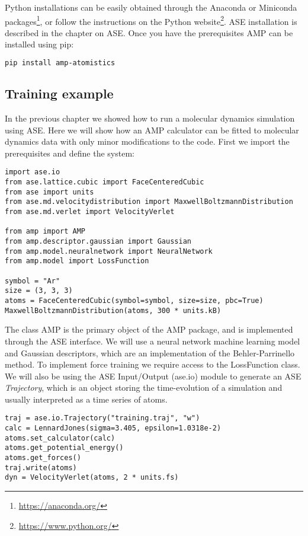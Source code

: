 Python installations can be easily obtained through the Anaconda 
or Miniconda packages\footnote{\url{https://anaconda.org/}},
or follow the instructions on the Python website\footnote{
\url{https://www.python.org/}}.
ASE installation is described in the chapter on ASE.
Once you have the prerequisites AMP can be installed using pip:

\begin{lstlisting}[language=bash]
pip install amp-atomistics
\end{lstlisting}

\subsection{Training example}
In the previous chapter we showed how to run a molecular dynamics
simulation using ASE. Here we will show how an AMP calculator
can be fitted to molecular dynamics data with only minor
modifications to the code.
First we import the prerequisites and define the system:

\begin{verbatim}
import ase.io
from ase.lattice.cubic import FaceCenteredCubic
from ase import units
from ase.md.velocitydistribution import MaxwellBoltzmannDistribution
from ase.md.verlet import VelocityVerlet

from amp import AMP
from amp.descriptor.gaussian import Gaussian
from amp.model.neuralnetwork import NeuralNetwork
from amp.model import LossFunction

symbol = "Ar"
size = (3, 3, 3)
atoms = FaceCenteredCubic(symbol=symbol, size=size, pbc=True)
MaxwellBoltzmannDistribution(atoms, 300 * units.kB)
\end{verbatim}

The class AMP is the primary object of the AMP package,
and is implemented through the ASE interface.
We will use a neural network machine learning model
and Gaussian descriptors, which are an implementation of the
Behler-Parrinello method. To implement force training we require
access to the LossFunction class.
We will also be using the ASE Input/Output (ase.io) module to generate an
ASE \textit{Trajectory}, which is an object
storing the time-evolution of a simulation and usually interpreted
as a time series of atoms.

\begin{verbatim}
traj = ase.io.Trajectory("training.traj", "w")
calc = LennardJones(sigma=3.405, epsilon=1.0318e-2)
atoms.set_calculator(calc)
atoms.get_potential_energy()
atoms.get_forces()
traj.write(atoms)
dyn = VelocityVerlet(atoms, 2 * units.fs)
\end{verbatim}


